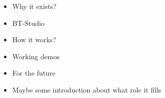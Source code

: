 \documentclass[notes,slidesec,a4]{seminar}
\title{\color{red}{BT Studio: a ROS Behaviour-Tree web IDE}}
\author{Asociación de Robótica e Inteligencia Artificial JdeRobot}
\date{josemaria.plaza@gmail.com, oscar.robotics@tutanota.com, javizqh@gmail.com}
\begin{document}
\maketitle


\begin{hslide}
    \begin{itemize}
\item Why it exists?
\item BT-Studio
\item How it works?
\item Working demos
\item For the future
\end{itemize}
\end{hslide}

\begin{hslide}

\newpage
{}
\begin{itemize}
\item Maybe some introduction about what role it fills
\end{itemize}
\end{hslide}
\end{document}
